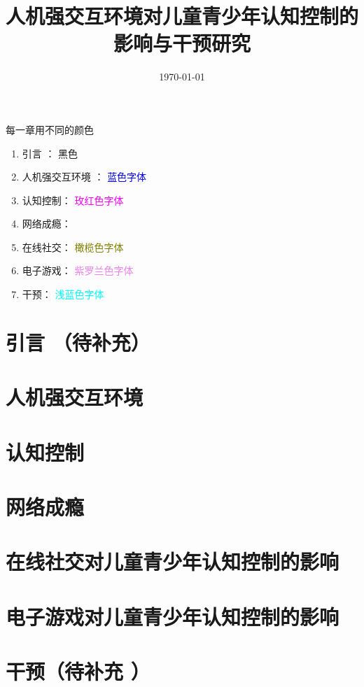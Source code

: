 \documentclass[12pt]{book}
\title{人机强交互环境对儿童青少年认知控制的影响与干预研究}
\date{\today}
\begin{document}
\maketitle

\tableofcontents

\newpage


每一章用不同的颜色
\begin{enumerate}
\item 引言 ：  黑色
\item 人机强交互环境 ： \textcolor{blue}{蓝色字体}
\item 认知控制： \textcolor{magenta}{ 玫红色字体}
\item 网络成瘾： 
\item 在线社交：  \textcolor{olive}{橄榄色字体}
\item 电子游戏： \textcolor{violet}{紫罗兰色字体}
\item 干预：\textcolor{cyan}{ 浅蓝色字体}
\end{enumerate}

\color{black}
\chapter{引言 （待补充）}




\color{black}
\chapter{人机强交互环境 
}



\color{black}
\chapter{认知控制 } 



\color{black}
\chapter{网络成瘾 }


\color{black}
\chapter{在线社交对儿童青少年认知控制的影响}


\color{black}
\chapter{电子游戏对儿童青少年认知控制的影响}


\color{black}
\chapter{干预（待补充 ）}






\end{document}
